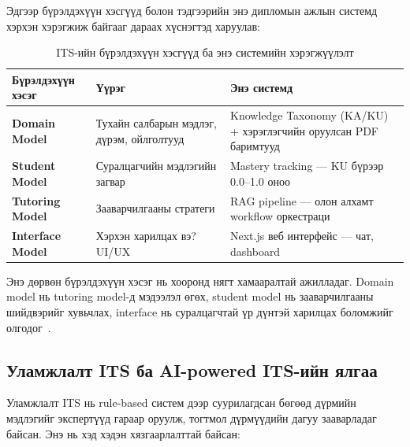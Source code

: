 \documentclass[12pt,A4]{report}
\newcommand{\eng}[1]{#1}
\begin{document}
Эдгээр бүрэлдэхүүн хэсгүүд болон тэдгээрийн энэ дипломын ажлын системд хэрхэн хэрэгжиж байгааг дараах хүснэгтэд харуулав:

\begin{table}[h!]
\centering
\caption{ITS-ийн бүрэлдэхүүн хэсгүүд ба энэ системийн хэрэгжүүлэлт}
\label{tab:its_components}
\begin{tabularx}{\textwidth}{>{\bfseries}l X X}
\toprule
\textbf{Бүрэлдэхүүн хэсэг} & \textbf{Үүрэг} & \textbf{Энэ системд} \\
\midrule
\rowcolor{lightbg}
\eng{Domain Model} & Тухайн салбарын мэдлэг, дүрэм, ойлголтууд & \eng{Knowledge Taxonomy} (KA/KU) + хэрэглэгчийн оруулсан PDF баримтууд \\
\eng{Student Model} & Суралцагчийн мэдлэгийн загвар & \eng{Mastery tracking} — KU бүрээр 0.0--1.0 оноо \\
\rowcolor{lightbg}
\eng{Tutoring Model} & Зааварчилгааны стратеги & RAG pipeline — олон алхамт workflow оркестраци \\
\eng{Interface Model} & Хэрхэн харилцах вэ? UI/UX & \eng{Next.js} веб интерфейс — чат, \eng{dashboard} \\
\bottomrule
\end{tabularx}
\end{table}

Энэ дөрвөн бүрэлдэхүүн хэсэг нь хооронд нягт хамааралтай ажилладаг. \eng{Domain model} нь \eng{tutoring model}-д мэдээлэл өгөх, \eng{student model} нь зааварчилгааны шийдвэрийг хувьчлах, \eng{interface} нь суралцагчтай үр дүнтэй харилцах боломжийг олгодог~\cite{sciencedirect2024}.

\subsection{Уламжлалт ITS ба AI-powered ITS-ийн ялгаа}

Уламжлалт ITS нь \eng{rule-based} систем дээр суурилагдсан бөгөөд дүрмийн мэдлэгийг экспертүүд гараар оруулж, тогтмол дүрмүүдийн дагуу зааварладаг байсан. Энэ нь хэд хэдэн хязгаарлалттай байсан:
\end{document}
